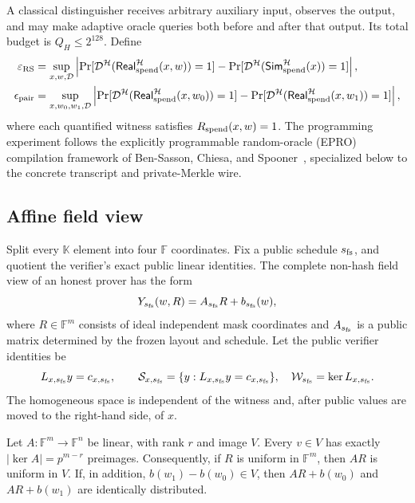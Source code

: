A classical distinguisher receives arbitrary auxiliary input, observes the
output, and may make adaptive oracle queries both before and after that
output.  Its total budget is \(Q_H\le2^{128}\).  Define
\begin{align*}
 \varepsilon_{\rm RS}
   &=\sup_{x,w,\mathcal D}
       \left|\Pr[\mathcal D^{\mathcal H}
          (\mathsf{Real}_{\mathrm{spend}}^{\mathcal H}(x,w))=1]
       -\Pr[\mathcal D^{\mathcal H}
          (\mathsf{Sim}_{\mathrm{spend}}^{\mathcal H}(x))=1]\right|,\\
 \epsilon_{\rm pair}
   &=\sup_{x,w_0,w_1,\mathcal D}
       \left|\Pr[\mathcal D^{\mathcal H}
          (\mathsf{Real}_{\mathrm{spend}}^{\mathcal H}(x,w_0))=1]
       -\Pr[\mathcal D^{\mathcal H}
          (\mathsf{Real}_{\mathrm{spend}}^{\mathcal H}(x,w_1))=1]\right|,
\end{align*}
where each quantified witness satisfies \(R_{\mathrm{spend}}(x,w)=1\).
The programming experiment follows the explicitly programmable random-oracle
(EPRO) compilation framework of
Ben-Sasson, Chiesa, and Spooner~\cite{BenSassonChiesaSpooner2016}, specialized
below to the concrete \Profile{} transcript and private-Merkle wire.

\subsection{Affine field view}

Split every \(\mathbb K\) element into four \(\mathbb F\) coordinates.  Fix
a public schedule \(s_{\rm fs}\), and quotient the verifier's exact public
linear identities.  The complete non-hash field view of an honest prover has
the form
\begin{equation}
  Y_{s_{\rm fs}}(w,R)=A_{s_{\rm fs}}R+b_{s_{\rm fs}}(w),
  \label{eq:affine-field-view}
\end{equation}
where \(R\in\mathbb F^m\) consists of ideal independent mask coordinates and
\(A_{s_{\rm fs}}\) is a public matrix determined by the frozen layout and
schedule.  Let the public verifier identities be
\[
 L_{x,s_{\rm fs}}y=c_{x,s_{\rm fs}},\qquad
 \mathcal S_{x,s_{\rm fs}}
   =\{y:L_{x,s_{\rm fs}}y=c_{x,s_{\rm fs}}\},
 \quad
 \mathcal W_{s_{\rm fs}}=\ker L_{x,s_{\rm fs}}.
\]
The homogeneous space is independent of the witness and, after public values
are moved to the right-hand side, of \(x\).

\begin{lemma}
\label{lem:uniform-mask-preimages}
Let \(A:\mathbb F^m\rightarrow\mathbb F^n\) be linear, with rank \(r\) and
image \(V\).  Every \(v\in V\) has exactly
\(
 |\ker A|=p^{m-r}
\)
preimages.  Consequently, if \(R\) is uniform in \(\mathbb F^m\), then
\(AR\) is uniform in \(V\).  If, in addition,
\(b(w_1)-b(w_0)\in V\), then
\(AR+b(w_0)\) and \(AR+b(w_1)\) are identically distributed.
\end{lemma}

